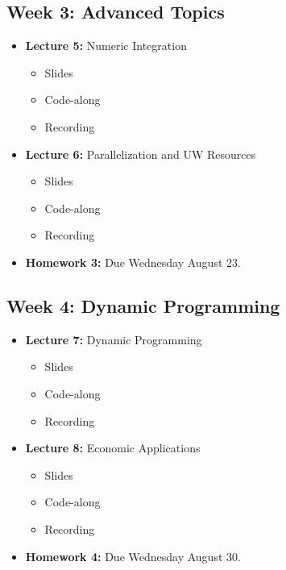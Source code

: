 \documentclass[
]{book}
\providecommand{\tightlist}{%
  \setlength{\itemsep}{0pt}\setlength{\parskip}{0pt}}
\begin{document}
\hypertarget{week-3-advanced-topics}{%
\subsection{Week 3: Advanced Topics}\label{week-3-advanced-topics}}

\begin{itemize}
\tightlist
\item
  \textbf{Lecture 5:} Numeric Integration

  \begin{itemize}
  \tightlist
  \item
    Slides
  \item
    Code-along
  \item
    Recording
  \end{itemize}
\item
  \textbf{Lecture 6:} Parallelization and UW Resources

  \begin{itemize}
  \tightlist
  \item
    Slides
  \item
    Code-along
  \item
    Recording
  \end{itemize}
\item
  \textbf{Homework 3:} Due Wednesday August 23.
\end{itemize}

\hypertarget{week-4-dynamic-programming}{%
\subsection{Week 4: Dynamic Programming}\label{week-4-dynamic-programming}}

\begin{itemize}
\tightlist
\item
  \textbf{Lecture 7:} Dynamic Programming

  \begin{itemize}
  \tightlist
  \item
    Slides
  \item
    Code-along
  \item
    Recording
  \end{itemize}
\item
  \textbf{Lecture 8:} Economic Applications

  \begin{itemize}
  \tightlist
  \item
    Slides
  \item
    Code-along
  \item
    Recording
  \end{itemize}
\item
  \textbf{Homework 4:} Due Wednesday August 30.
\end{itemize}
\end{document}
